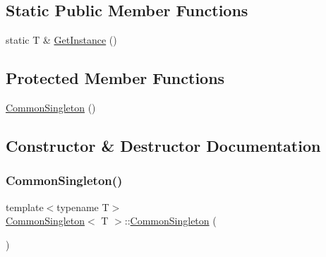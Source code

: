 \subsection*{Static Public Member Functions}
\begin{DoxyCompactItemize}
\item 
static T \& \mbox{\hyperlink{class_common_singleton_a77cfefba5f8a8a3302851c40bfc51e38}{Get\+Instance}} ()
\end{DoxyCompactItemize}
\subsection*{Protected Member Functions}
\begin{DoxyCompactItemize}
\item 
\mbox{\hyperlink{class_common_singleton_ab5610129162f0b9b3d47d3c3eb9425e2}{Common\+Singleton}} ()
\end{DoxyCompactItemize}


\subsection{Constructor \& Destructor Documentation}
\mbox{\label{class_common_singleton_a00a83433e7f0b2895e436a8426ff5044}} 
\subsubsection{\texorpdfstring{CommonSingleton()}{CommonSingleton()}\hspace{0.1cm}{\footnotesize\ttfamily [1/2]}}
{\footnotesize\ttfamily template$<$typename T$>$ \\
\mbox{\hyperlink{class_common_singleton}{Common\+Singleton}}$<$ T $>$\+::\mbox{\hyperlink{class_common_singleton}{Common\+Singleton}} (\begin{DoxyParamCaption}\item[{const \mbox{\hyperlink{class_common_singleton}{Common\+Singleton}}$<$ T $>$ \&}]{ }\end{DoxyParamCaption})\hspace{0.3cm}{\ttfamily [delete]}}

\mbox{\label{class_common_singleton_ab5610129162f0b9b3d47d3c3eb9425e2}} 
